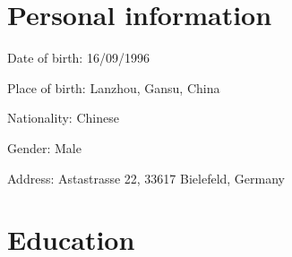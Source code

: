 \documentclass[a4paper,12pt]{article}
\begin{document}

\section{Personal information}
Date of birth: 16/09/1996

Place of birth: Lanzhou, Gansu, China

Nationality: Chinese

Gender: Male

Address: Astastrasse 22, 33617 Bielefeld, Germany

\section{Education}
\end{document}
